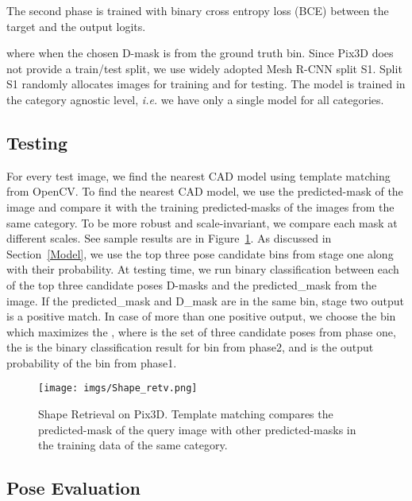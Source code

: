 \documentclass[letterpaper, 10 pt, conference]{ieeeconf}  \pdfoutput=1
\begin{document}
The second phase is trained with binary cross entropy loss (BCE) between the target and the output logits.

where  when the chosen
D-mask is from the ground truth bin.
Since Pix3D does not provide a train/test split, we use widely adopted Mesh R-CNN split S1. Split S1 randomly allocates  images for training and  for testing. The model is trained in the category agnostic level, 
{\em i.e.} we have only a single model for all categories.

\subsection{Testing} 
For every test image, we find the nearest CAD model using template matching from OpenCV. To find the nearest CAD model, we use the predicted-mask of the image and compare it with the training predicted-masks of the images from the same category. To be more robust and scale-invariant, we compare each mask at different scales. See sample results are in Figure~\ref{shaperetv}.
As discussed in Section~\ref{Model}, we use the top three pose candidate bins from stage one along with their probability. At testing time, we run binary classification between each of the top three candidate poses D-masks and the predicted\_mask from the image. If the predicted\_mask and D\_mask are in the same bin, stage two output is a positive match. In case of more than one positive output, we choose the bin which maximizes the , where  is the set of three candidate poses from phase one, the  is the binary classification result for bin  from phase2, and  is the output probability of the bin from phase1. 









\begin{figure}[htbp]

\begin{center}
\texttt{[image: imgs/Shape\_retv.png]}
\end{center}
   \caption{Shape Retrieval on Pix3D. Template matching compares the predicted-mask of the query image with other predicted-masks in the training data of the same category.}
    \label{shaperetv}
\end{figure}







\subsection{Pose Evaluation}
\end{document}
